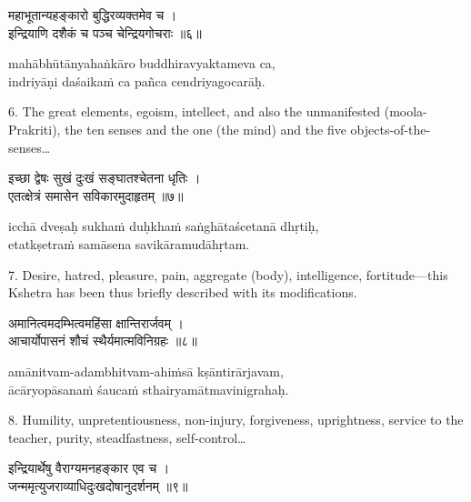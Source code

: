 \begin{gitaverse}
महाभूतान्यहङ्कारो बुद्धिरव्यक्तमेव च । \\
इन्द्रियाणि दशैकं च पञ्च चेन्द्रियगोचराः ॥६॥
\end{gitaverse}

\begin{transliteration}
mahābhūtānyahaṅkāro buddhiravyaktameva ca, \\
indriyāṇi daśaikaṁ ca pañca cendriyagocarāḥ.
\end{transliteration}

6. The great elements, egoism, intellect, and also the unmanifested
(moola-Prakriti), the ten senses and the one (the mind) and the five
objects-of-the-senses\ldots

\begin{gitaverse}
इच्छा द्वेषः सुखं दुःखं सङ्घातश्चेतना धृतिः । \\
एतत्क्षेत्रं समासेन सविकारमुदाहृतम् ॥७॥
\end{gitaverse}

\begin{transliteration}
icchā dveṣaḥ sukhaṁ duḥkhaṁ saṅghātaścetanā dhṛtiḥ, \\
etatkṣetraṁ samāsena savikāramudāhṛtam.
\end{transliteration}

7. Desire, hatred, pleasure, pain, aggregate (body), intelligence,
fortitude---this Kshetra has been thus briefly described with its
modifications.

\begin{gitaverse}
अमानित्वमदम्भित्वमहिंसा क्षान्तिरार्जवम् । \\
आचार्योपासनं शौचं स्थैर्यमात्मविनिग्रहः ॥८॥
\end{gitaverse}

\begin{transliteration}
amānitvam-adambhitvam-ahiṁsā kṣāntirārjavam, \\
ācāryopāsanaṁ śaucaṁ sthairyamātmavinigrahaḥ.
\end{transliteration}

8. Humility, unpretentiousness, non-injury, forgiveness, uprightness, service
to the teacher, purity, steadfastness, self-control\ldots

\begin{gitaverse}
इन्द्रियार्थेषु वैराग्यमनहङ्कार एव च । \\
जन्ममृत्युजराव्याधिदुःखदोषानुदर्शनम् ॥९॥
\end{gitaverse}

